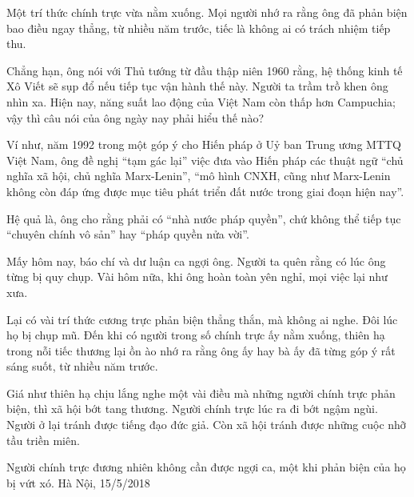 Một trí thức chính trực vừa nằm xuống. Mọi người nhớ ra rằng ông đã phản biện bao điều ngay thẳng, từ nhiều năm trước, tiếc là không ai có trách nhiệm tiếp thu.

Chẳng hạn, ông nói với Thủ tướng từ đầu thập niên 1960 rằng, hệ thống kinh tế Xô Viết sẽ sụp đổ nếu tiếp tục vận hành thế này. Người ta trầm trồ khen ông nhìn xa. Hiện nay, năng suất lao động của Việt Nam còn thấp hơn Campuchia; vậy thì câu nói của ông ngày nay phải hiểu thế nào?

Ví như, năm 1992 trong một góp ý cho Hiến pháp ở Uỷ ban Trung ương MTTQ Việt Nam, ông đề nghị “tạm gác lại” việc đưa vào Hiến pháp các thuật ngữ “chủ nghĩa xã hội, chủ nghĩa Marx-Lenin”, “mô hình CNXH, cũng như Marx-Lenin không còn đáp ứng được mục tiêu phát triển đất nước trong giai đoạn hiện nay”.

Hệ quả là, ông cho rằng phải có “nhà nước pháp quyền”, chứ không thể tiếp tục “chuyên chính vô sản” hay “pháp quyền nửa vời”.

Mấy hôm nay, báo chí và dư luận ca ngợi ông. Người ta quên rằng có lúc ông từng bị quy chụp. Vài hôm nữa, khi ông hoàn toàn yên nghỉ, mọi việc lại như xưa. 

Lại có vài trí thức cương trực phản biện thẳng thắn, mà không ai nghe. Đôi lúc họ bị chụp mũ. Đến khi có người trong số chính trực ấy nằm xuống, thiên hạ trong nỗi tiếc thương lại ồn ào nhớ ra rằng ông ấy hay bà ấy đã từng góp ý rất sáng suốt, từ nhiều năm trước.

Giá như thiên hạ chịu lắng nghe một vài điều mà những người chính trực phản biện, thì xã hội bớt tang thương. Người chính trực lúc ra đi bớt ngậm ngùi. Người ở lại tránh được tiếng đạo đức giả. Còn xã hội tránh được những cuộc nhỡ tầu triền miên.   

Người chính trực đương nhiên không cần được ngợi ca, một khi phản biện của họ bị vứt xó. 
Hà Nội, 15/5/2018